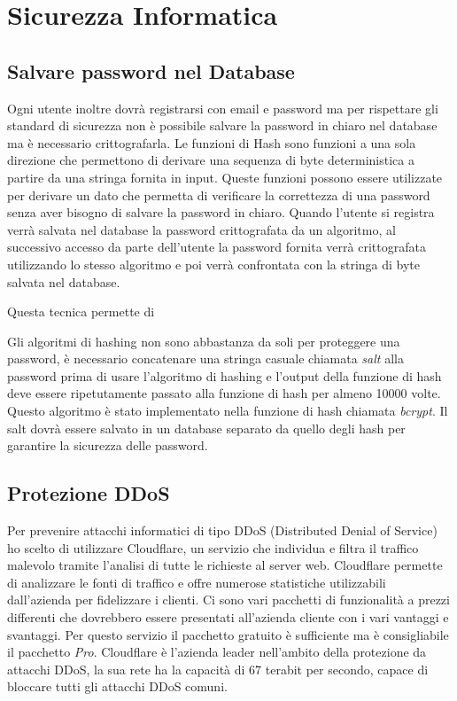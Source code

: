 \section{Sicurezza Informatica}

\subsection{Salvare password nel Database}%
\label{sub:password}

Ogni utente inoltre dovr\`a registrarsi con email e password ma per rispettare gli standard di sicurezza non \`e possibile salvare la password in chiaro nel database ma \`e necessario crittografarla. Le funzioni di Hash sono funzioni a una sola direzione che permettono di derivare una sequenza di byte deterministica a partire da una stringa fornita in input. Queste funzioni possono essere utilizzate per derivare un dato che permetta di verificare la correttezza di una password senza aver bisogno di salvare la password in chiaro. Quando l'utente si registra verr\`a salvata nel database la password crittografata da un algoritmo, al successivo accesso da parte dell'utente la password fornita verr\`a crittografata utilizzando lo stesso algoritmo e poi verr\`a confrontata con la stringa di byte salvata nel database.

Questa tecnica permette di 

Gli algoritmi di hashing non sono abbastanza da soli per proteggere una password, \`e necessario concatenare una stringa casuale chiamata \emph{salt} alla password prima di usare l'algoritmo di hashing e l'output della funzione di hash deve essere ripetutamente passato alla funzione di hash per almeno 10000 volte. Questo algoritmo \`e stato implementato nella funzione di hash chiamata \emph{bcrypt}. Il salt dovr\`a essere salvato in un database separato da quello degli hash per garantire la sicurezza delle password.


\subsection{Protezione DDoS}%
\label{sub:pretezione_ddos}

Per prevenire attacchi informatici di tipo DDoS (Distributed Denial of Service) ho scelto di utilizzare Cloudflare, un servizio che individua e filtra il traffico malevolo tramite l'analisi di tutte le richieste al server web. Cloudflare permette di analizzare le fonti di traffico e offre numerose statistiche utilizzabili dall'azienda per fidelizzare i clienti. Ci sono vari pacchetti di funzionalit\`a a prezzi differenti che dovrebbero essere presentati all'azienda cliente con i vari vantaggi e svantaggi. Per questo servizio il pacchetto gratuito \`e sufficiente ma \`e consigliabile il pacchetto \emph{Pro}. Cloudflare \`e l'azienda leader nell'ambito della protezione da attacchi DDoS, la sua rete ha la capacit\`a di 67 terabit per secondo, capace di bloccare tutti gli attacchi DDoS comuni. %

